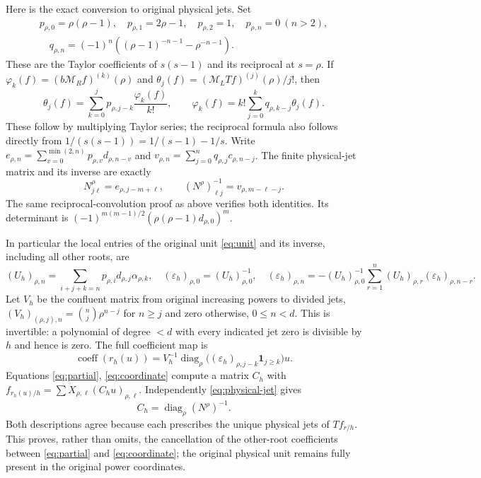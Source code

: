 \documentclass[11pt]{article}
\newcommand{\ML}{\mathcal M_{\!L}}\newcommand{\MR}{\mathcal M_{\!R}}
\begin{document}
Here is the exact conversion to original physical jets. Set
\begin{equation}\label{eq:pq}
 \begin{gathered}
 p_{\rho,0}=\rho(\rho-1),\quad p_{\rho,1}=2\rho-1,
 \quad p_{\rho,2}=1,\quad p_{\rho,n}=0\ (n>2),\\
 \quad q_{\rho,n}=(-1)^n\left((\rho-1)^{-n-1}-\rho^{-n-1}\right).
 \end{gathered}
\end{equation}
These are the Taylor coefficients of $s(s-1)$ and its reciprocal
at $s=\rho$. If $\varphi_k(f)=(b\MR f)^{(k)}(\rho)$ and
$\theta_j(f)=(\ML Tf)^{(j)}(\rho)/j!$, then
\begin{equation}\label{eq:jet-conversion}
 \theta_j(f)=\sum_{k=0}^j p_{\rho,j-k}\frac{\varphi_k(f)}{k!},
 \qquad
 \varphi_k(f)=k!\sum_{j=0}^kq_{\rho,k-j}\theta_j(f).
\end{equation}
These follow by multiplying Taylor series; the reciprocal formula
also follows directly from
$1/(s(s-1))=1/(s-1)-1/s$.
Write $e_{\rho,n}=\sum_{v=0}^{\min(2,n)}p_{\rho,v}d_{\rho,n-v}$
and $v_{\rho,n}=\sum_{j=0}^nq_{\rho,j}c_{\rho,n-j}$.
The finite physical-jet matrix and its inverse are exactly
\begin{equation}\label{eq:physical-jet}
 N^\rho_{j\ell}=e_{\rho,j-m+\ell},\qquad
 (N^\rho)^{-1}_{\ell j}=v_{\rho,m-\ell-j}.
\end{equation}
The same reciprocal-convolution proof as above verifies both
identities. Its determinant is
$(-1)^{m(m-1)/2}(\rho(\rho-1)d_{\rho,0})^m$.

In particular the local entries of the original unit
\eqref{eq:unit} and its inverse, including all other roots, are
\begin{equation}\label{eq:fullunit}
 (U_h)_{\rho,n}=\sum_{i+j+k=n}p_{\rho,i}d_{\rho,j}\alpha_{\rho,k},
 \quad(\varepsilon_h)_{\rho,0}=(U_h)_{\rho,0}^{-1},\quad
 (\varepsilon_h)_{\rho,n}=-(U_h)_{\rho,0}^{-1}
       \sum_{r=1}^n(U_h)_{\rho,r}(\varepsilon_h)_{\rho,n-r}.
\end{equation}
Let $V_h$ be the confluent matrix from original increasing powers
to divided jets, $(V_h)_{(\rho,j),n}=\binom nj\rho^{n-j}$ for
$n\geq j$ and zero otherwise, $0\leq n<d$. This is invertible:
a polynomial of degree $<d$ with every indicated jet zero is
divisible by $h$ and hence is zero. The full coefficient map is
\begin{equation}\label{eq:coordinate}
 \operatorname{coeff}(r_h(u))=
 V_h^{-1}\operatorname{diag}_{\rho}
       \bigl((\varepsilon_h)_{\rho,j-k}\mathbf1_{j\geq k}\bigr)u.
\end{equation}
Equations \eqref{eq:partial}, \eqref{eq:coordinate} compute a
matrix $C_h$ with $f_{r_h(u)/h}=\sum X_{\rho,\ell}(C_hu)_{\rho,\ell}$.
Independently \eqref{eq:physical-jet} gives
\begin{equation}\label{eq:Ch}
 C_h=\operatorname{diag}_{\rho}(N^\rho)^{-1}.
\end{equation}
Both descriptions agree because each prescribes the unique
physical jets of $T f_{r/h}$. This proves, rather than omits,
the cancellation of the other-root coefficients between
\eqref{eq:partial} and \eqref{eq:coordinate}; the original
physical unit remains fully present in the original power coordinates.
\end{document}
